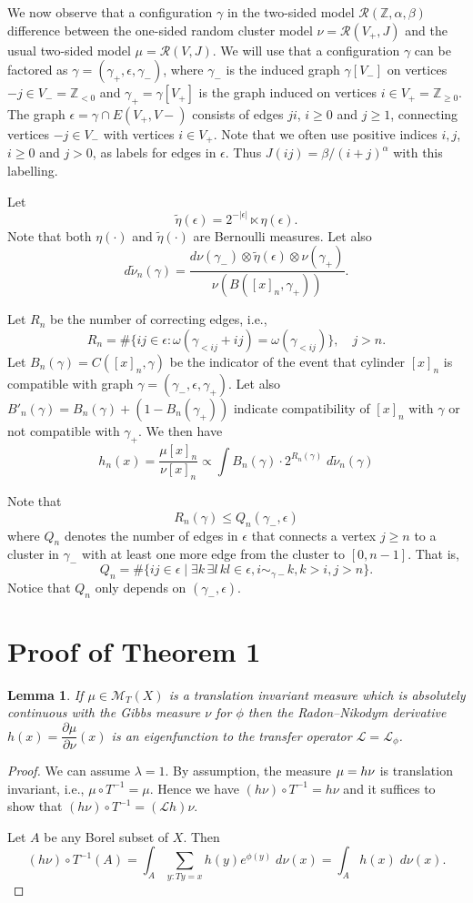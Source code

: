 \documentclass[11pt, a4paper]{amsart}
\newtheorem{lem}[thm]{Lemma}
\theoremstyle{definition}
\theoremstyle{remark}
\providecommand{\ZZ}{\mathbb{Z}}
\providecommand{\CM}{\mathscr{M}}
\providecommand{\mscr}{\mathscr}
\providecommand{\e}{\epsilon}
\providecommand{\g}{\gamma}
\def\X{X}
\def\T{T}
\begin{document}
We now observe that a configuration $\g$ in the two-sided model
$\mscr R(\ZZ,\alpha,\beta)$ difference between the one-sided random cluster model
$\nu = \mscr R(V_+,J)$ and the usual two-sided model $\mu = \mscr R(V,J)$. We will
use that a configuration $\g$ can be factored as $\g = (\g_+, \e, \g_-)$, where
$\g_-$ is the induced graph $\g[V_-]$ on vertices $-j\in V_-=\ZZ_{<0}$ and
$\g_+=\g[V_+]$ is the graph induced on vertices $i\in V_+=\ZZ_{\ge0}$. The graph
$\e=\g\cap E(V_+,V-)$ consists of edges $ji$, $i\ge0$ and $j\ge 1$, connecting vertices
$-j\in V_-$ with vertices $i\in V_+$. Note that we often use positive indices $i,j$,
$i\ge0$ and $j>0$, as labels for edges in $\e$. Thus $J(ij)=\beta/(i+j)^\alpha$ with this
labelling.

Let
$$ \tilde \eta(\epsilon)= 2^{-|\epsilon|} \ltimes \eta (\epsilon). $$
Note that both $\eta(\cdot)$ and $\tilde\eta (\cdot)$ are Bernoulli measures. Let also
$$ d\tilde \nu_n(\gamma) = \frac{d\nu(\gamma_-)\otimes \tilde \eta(\epsilon)\otimes \nu(\gamma_+)}{\nu(B([x]_n,\gamma_+))}. $$

Let $R_n$ be the number of correcting edges, i.e.,
$$
R_n=\# \{ij\in \epsilon: \omega (\gamma_{<ij}+ij)=\omega (\gamma_{<ij})\},\quad j>n.
$$
Let $B_n(\g)=C([x]_n,\gamma)$ be the indicator of the event that cylinder $[x]_n$ is
compatible with graph $\g=(\g_-,\e,\g_+)$. Let also
$B'_n(\g) = B_n(\g) + (1-B_n(\g_+))$ indicate compatibility of $[x]_n$ with $\g$
or not compatible with $\g_+$. We then have
\[
  h_n(x) = \frac{\mu [x]_n}{\nu [x]_n}\propto \int B_n(\g) \cdot 2^{R_n(\g)} \; d\tilde \nu_n (\gamma)
\]

Note that
$$ R_n(\g) \le Q_n(\g_-,\e) $$
where $Q_n$ denotes the number of edges in $\e$ that connects a vertex $j\ge n$ to a
cluster in $\g_-$ with at least one more edge from the cluster to $[0,n-1]$. That is,
$$  Q_n=\# \{ij \in \epsilon \mid  \exists k\, \exists l\, kl\in\e,  i \sim_{\gamma-} k, k>i, j > n\}.$$
Notice that $Q_n$ only depends on $(\gamma_-,\epsilon)$.



\section{Proof of Theorem 1}\noindent

\begin{lem}
  If $\mu\in\CM_\T(\X)$ is a translation invariant measure which is absolutely
  continuous with the Gibbs measure $\nu$ for $\phi$ then the Radon--Nikodym
  derivative $h(x)=\dfrac{\partial\mu}{\partial\nu}(x)$ is an eigenfunction to the transfer
  operator $\mscr L =\mscr L_\phi$.
\end{lem}
\begin{proof}
  We can assume $\lambda=1$. By assumption, the measure $\mu= h \nu$ is translation
  invariant, i.e., $\mu\circ T^{-1}=\mu$. Hence we have $(h\nu)\circ T^{-1}=h\nu$ and it
  suffices to show that $(h\nu) \circ T^{-1}=({\mathcal L}h)\nu$.

  Let $A$ be any Borel subset of $\X$. Then
  $$(h\nu)\circ T^{-1} (A)=\int_A \sum_{y: Ty=x} h(y)e^{\phi(y)}\; d\nu(x)=\int_A h(x)\; d\nu(x).$$
\end{proof}
\end{document}
